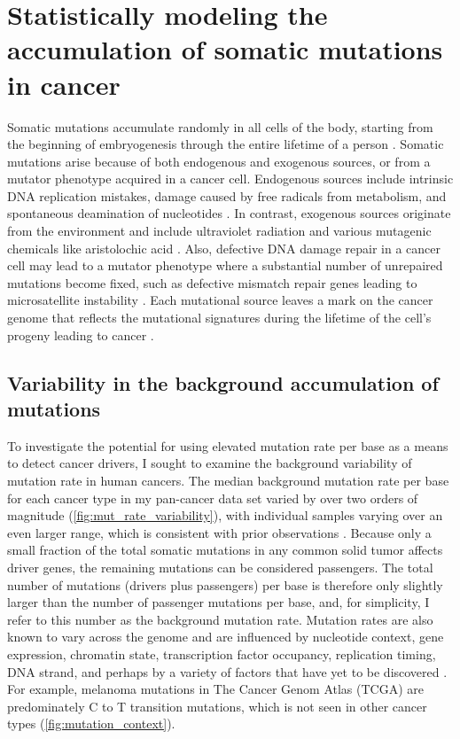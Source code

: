 
\chapter{Statistically modeling the accumulation of somatic mutations in cancer}
\label{chap:ch2}

Somatic mutations accumulate randomly in all cells of the body, starting from the beginning of embryogenesis through the entire lifetime of a person \cite{RN63}. Somatic mutations arise because of both endogenous and exogenous sources, or from a mutator phenotype acquired in a cancer cell. Endogenous sources include intrinsic DNA replication mistakes, damage caused by free radicals from metabolism, and spontaneous deamination of nucleotides \cite{RN64}. In contrast, exogenous sources originate from the environment and include ultraviolet radiation \cite{RN64} and various mutagenic chemicals like aristolochic acid \cite{RN65}.  Also, defective DNA damage repair in a cancer cell may lead to a mutator phenotype where a substantial number of unrepaired mutations become fixed, such as defective mismatch repair genes leading to microsatellite instability \cite{RN68}. Each mutational source leaves a mark on the cancer genome that reflects the mutational signatures during the lifetime of the cell's progeny leading to cancer \cite{RN64}.

\section{Variability in the background accumulation of mutations}

To investigate the potential for using elevated mutation rate per base as a means to detect cancer drivers, I sought to examine the background variability of mutation rate in human cancers. The median background mutation rate per base for each cancer type in my pan-cancer data set \cite{RN70} varied by over two orders of magnitude (\autoref{fig:mut_rate_variability}), with individual samples varying over an even larger range, which is consistent with prior observations \cite{RN13, RN51}. Because only a small fraction of the total somatic mutations in any common solid tumor affects driver genes, the remaining mutations can be considered passengers. The total number of mutations (drivers plus passengers) per base is therefore only slightly larger than the number of passenger mutations per base, and, for simplicity, I refer to this number as the background mutation rate. Mutation rates are also known to vary across the genome \cite{RN13} and are influenced by nucleotide context, gene expression, chromatin state, transcription factor occupancy, replication timing, DNA strand, and perhaps by a variety of factors that have yet to be discovered \cite{RN72, RN73, RN51, RN74}. For example, melanoma mutations in The Cancer Genom Atlas (TCGA) are predominately C to T transition mutations, which is not seen in other cancer types (\autoref{fig:mutation_context}).

